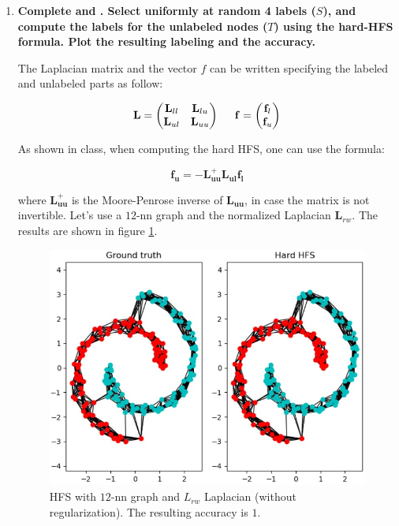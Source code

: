 \documentclass[a4paper, 11pt]{article}
\begin{document}
\begin{enumerate}
	\item \textbf{Complete  and . Select uniformly at random 4 labels ($S$), and compute the labels for the unlabeled nodes ($T$) using the hard-HFS formula. Plot the resulting labeling and the accuracy.}
	
    The Laplacian matrix and the vector $f$ can be written specifying the labeled and unlabeled parts as follow:
    
    \begin{equation*}
        \mathbf{L} = \begin{pmatrix}
            \mathbf{L}_{ll} & \mathbf{L}_{lu} \\
            \mathbf{L}_{ul} & \mathbf{L}_{uu}
        \end{pmatrix}
        \hspace*{.5cm}
        \mathbf{f} = \begin{pmatrix}
            \mathbf{f}_{l} \\
            \mathbf{f}_{u}
        \end{pmatrix}
    \end{equation*}
	
	As shown in class, when computing the hard HFS, one can use the formula:
	
	\begin{equation*}
	    \mathbf{f_{u}} = - \mathbf{L_{uu}^{+}} \mathbf{L_{ul}} \mathbf{f_{l}}
	\end{equation*}
	
	where $\mathbf{L_{uu}^{+}}$ is the Moore-Penrose inverse of $\mathbf{L_{uu}}$, in case the matrix is not invertible. Let's use a $12$-nn graph and the normalized Laplacian $\mathbf{L}_{rw}$. The results are shown in figure \ref{fig:q11-hard-hfs}. \\
	
	\begin{figure}[!htb]
	    \centering
	    \includegraphics[width=.5\textwidth]{images/q11_hard-hfs.jpg}
	    \caption{HFS with $12$-nn graph and $L_{rw}$ Laplacian (without regularization). The resulting accuracy is $1$.}
	    \label{fig:q11-hard-hfs}
	\end{figure}
	

\end{enumerate}
\end{document}
